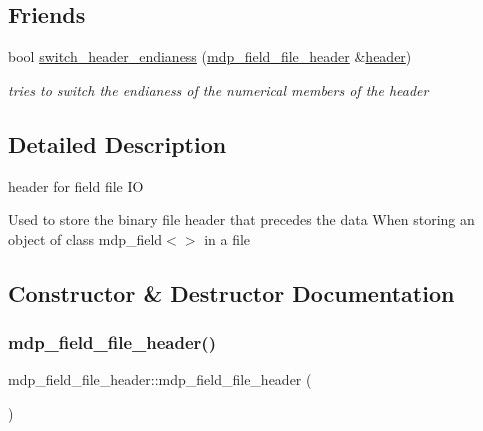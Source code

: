 \subsection*{Friends}
\begin{DoxyCompactItemize}
\item 
bool \hyperlink{classmdp__field__file__header_ab3818e6c0a7da0722f0157d14ef19e06}{switch\+\_\+header\+\_\+endianess} (\hyperlink{classmdp__field__file__header}{mdp\+\_\+field\+\_\+file\+\_\+header} \&\hyperlink{my__logger_8h_a30e2520a882d6e849f97da46b62f7790}{header})
\begin{DoxyCompactList}\small\item\em tries to switch the endianess of the numerical members of the header \end{DoxyCompactList}\end{DoxyCompactItemize}


\subsection{Detailed Description}
header for field file IO 

Used to store the binary file header that precedes the data When storing an object of class mdp\+\_\+field$<$$>$ in a file 

\subsection{Constructor \& Destructor Documentation}
\mbox{\label{classmdp__field__file__header_ab097916f6edf2141bf8219384c5c2d95}} 
\subsubsection{\texorpdfstring{mdp\+\_\+field\+\_\+file\+\_\+header()}{mdp\_field\_file\_header()}}
{\footnotesize\ttfamily mdp\+\_\+field\+\_\+file\+\_\+header\+::mdp\+\_\+field\+\_\+file\+\_\+header (\begin{DoxyParamCaption}{ }\end{DoxyParamCaption})\hspace{0.3cm}{\ttfamily [inline]}}



